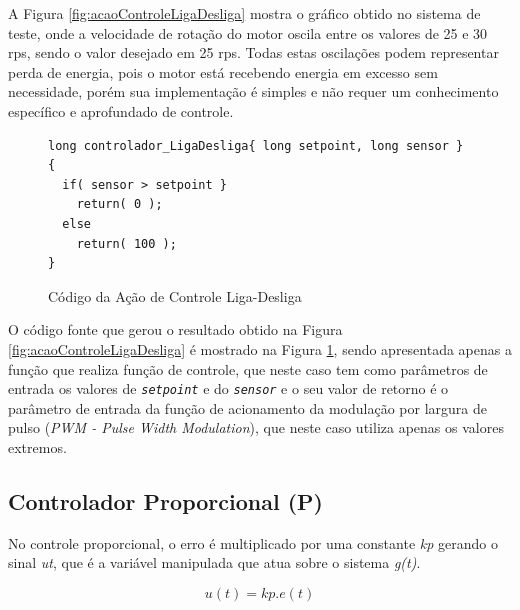 A Figura \ref{fig:acaoControleLigaDesliga} mostra o gráfico obtido no sistema de teste, onde a velocidade de rotação do motor oscila entre os valores de 25 e 30 rps, sendo o valor desejado em 25 rps. 
Todas estas oscilações podem representar perda de energia, pois o motor está recebendo energia em excesso sem necessidade, porém sua implementação é simples e não requer um conhecimento específico e aprofundado de controle.



\begin{figure}[!htb]
\centering
\begin{minipage}{0.8\linewidth}
\begin{lstlisting}
long controlador_LigaDesliga{ long setpoint, long sensor }
{
  if( sensor > setpoint }
    return( 0 );
  else
    return( 100 );
}
\end{lstlisting}
\end{minipage}
\caption{Código da Ação de Controle Liga-Desliga}
\label{fig:codigoAcaoLigaDesliga}
\end{figure}

O código fonte que gerou o resultado obtido na Figura \ref{fig:acaoControleLigaDesliga} é  mostrado na Figura \ref{fig:codigoAcaoLigaDesliga}, sendo apresentada apenas a função que realiza função de controle, que neste caso tem como parâmetros de entrada os valores de \textit{\texttt{setpoint}} e do \textit{\texttt{sensor}} e o seu valor de retorno é o parâmetro de entrada da função de acionamento da modulação por largura de pulso (\textit{PWM - Pulse Width Modulation}), que neste caso utiliza apenas os valores extremos.


\subsection{ Controlador Proporcional (P) } 

 No controle proporcional, o erro é multiplicado por uma constante \emph{kp} gerando o sinal \emph{u{t}}, que é a variável manipulada que atua sobre o sistema \emph{g(t)}.

\begin{equation}
 u(t) = kp . e(t)
\label{eq:acaoP}
\end{equation}




